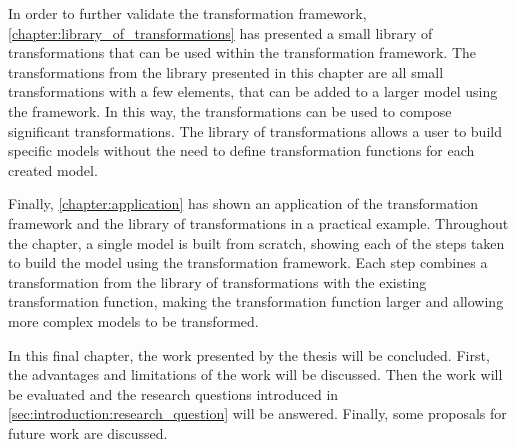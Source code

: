 In order to further validate the transformation framework, \cref{chapter:library_of_transformations} has presented a small library of transformations that can be used within the transformation framework. The transformations from the library presented in this chapter are all small transformations with a few elements, that can be added to a larger model using the framework. In this way, the transformations can be used to compose significant transformations. The library of transformations allows a user to build specific models without the need to define transformation functions for each created model.

Finally, \cref{chapter:application} has shown an application of the transformation framework and the library of transformations in a practical example. Throughout the chapter, a single model is built from scratch, showing each of the steps taken to build the model using the transformation framework. Each step combines a transformation from the library of transformations with the existing transformation function, making the transformation function larger and allowing more complex models to be transformed.

In this final chapter, the work presented by the thesis will be concluded. First, the advantages and limitations of the work will be discussed. Then the work will be evaluated and the research questions introduced in \cref{sec:introduction:research_question} will be answered. Finally, some proposals for future work are discussed.



